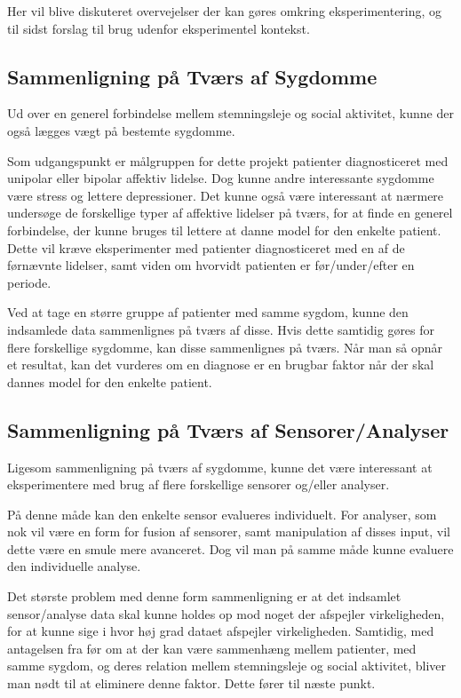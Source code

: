 Her vil blive diskuteret overvejelser der kan gøres omkring eksperimentering, og til sidst forslag til brug udenfor eksperimentel kontekst.

\subsection{Sammenligning på Tværs af Sygdomme}
Ud over en generel forbindelse mellem stemningsleje og social aktivitet, kunne der også lægges vægt på bestemte sygdomme.

Som udgangspunkt er målgruppen for dette projekt patienter diagnosticeret med unipolar eller bipolar affektiv lidelse.
Dog kunne andre interessante sygdomme være stress og lettere depressioner.
Det kunne også være interessant at nærmere undersøge de forskellige typer af affektive lidelser på tværs, for at finde en generel forbindelse, der kunne bruges til lettere at danne model for den enkelte patient.
Dette vil kræve eksperimenter med patienter diagnosticeret med en af de førnævnte lidelser, samt viden om hvorvidt patienten er før/under/efter en periode.

Ved at tage en større gruppe af patienter med samme sygdom, kunne den indsamlede data sammenlignes på tværs af disse.
Hvis dette samtidig gøres for flere forskellige sygdomme, kan disse sammenlignes på tværs.
Når man så opnår et resultat, kan det vurderes om en diagnose er en brugbar faktor når der skal dannes model for den enkelte patient.

\subsection{Sammenligning på Tværs af Sensorer/Analyser}
Ligesom sammenligning på tværs af sygdomme, kunne det være interessant at eksperimentere med brug af flere forskellige sensorer og/eller analyser.

På denne måde kan den enkelte sensor evalueres individuelt.
For analyser, som nok vil være en form for fusion af sensorer, samt manipulation af disses input, vil dette være en smule mere avanceret.
Dog vil man på samme måde kunne evaluere den individuelle analyse.

Det største problem med denne form sammenligning er at det indsamlet sensor/analyse data skal kunne holdes op mod noget der afspejler virkeligheden, for at kunne sige i hvor høj grad dataet afspejler virkeligheden.
Samtidig, med antagelsen fra før om at der kan være sammenhæng mellem patienter, med samme sygdom, og deres relation mellem stemningsleje og social aktivitet, bliver man nødt til at eliminere denne faktor.
Dette fører til næste punkt.

